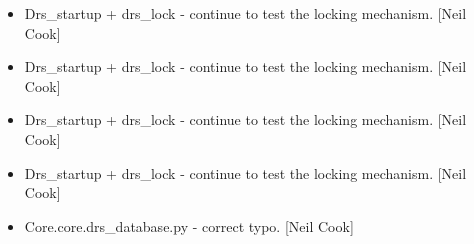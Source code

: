 \documentclass[a4paper,10pt,english]{report}
\begin{document}
\begin{itemize}
\item {} 
Drs\_startup + drs\_lock - continue to test the locking mechanism. {[}Neil
Cook{]}

\item {} 
Drs\_startup + drs\_lock - continue to test the locking mechanism. {[}Neil
Cook{]}

\item {} 
Drs\_startup + drs\_lock - continue to test the locking mechanism. {[}Neil
Cook{]}

\item {} 
Drs\_startup + drs\_lock - continue to test the locking mechanism. {[}Neil
Cook{]}

\item {} 
Core.core.drs\_database.py - correct typo. {[}Neil Cook{]}

\end{itemize}
\end{document}
